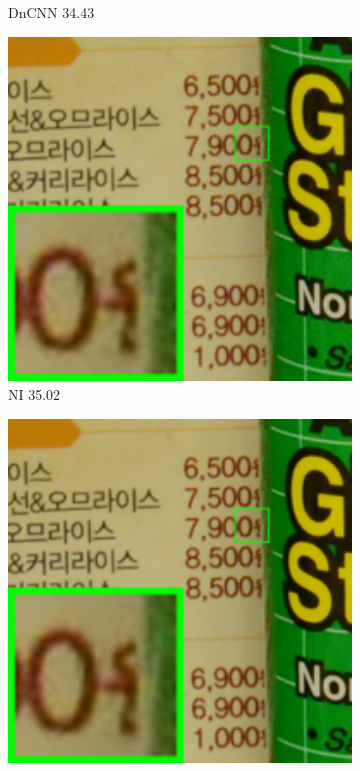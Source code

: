 \begin{figure}
\begin{subfigure}[t]{0.19\textwidth}
		\caption{DnCNN 34.43}
    \end{subfigure}
    \hfill
    \begin{subfigure}[t]{0.19\textwidth}
        \centering
        \includegraphics[width=1\textwidth]{images/guided/resize_br_NI_CC_Noisy_Nikon_D800_ISO_3200_A3_96.png}
		\caption{NI 35.02}
    \end{subfigure}
    \hfill
    \begin{subfigure}[t]{0.19\textwidth}
        \centering
        \includegraphics[width=1\textwidth]{images/guided/resize_br_NC_CC_Noisy_Nikon_D800_ISO_3200_A3_96.png}

\end{subfigure}
\end{figure}
